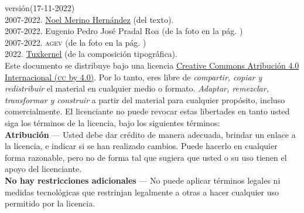 \documentclass[14pt,twoside,final]{extbook} %
\begin{document}
\setcounter{page}{1}
\parindent=5mm %
\parskip=0mm %
\newpage
\pagestyle{empty}
\newpage
\pagestyle{empty}
\vspace*{0pt}
\vfill
\begin{scriptsize}
\begin{flushleft}
\begin{minipage}{7.5cm}
\def\fileversion{1.016}
\def\filedate{(17-11-2022)}
versión\space\fileversion\space\filedate \\

\textcopyright{} 2007-2022. \href{noel_merino@yahoo.com.mx}{Noel Merino Hernández} (del texto). \\ \textcopyright{} 2007-2022. Eugenio Pedro José Pradal Roa (de la foto en la pág. \pageref{fig:jalacingo-photo}) \\ \textcopyright{} 2007-2022. \textsc{agev} (de la foto en la pág. \pageref{fig:progreso-industrial}) \\ \textcopyright{} 2022. \href{muxkernel@gmail.com}{Tuxkernel} (de la composición tipográfica). \\

\noindent Este documento se distribuye bajo una licencia \href{https://creativecommons.org/licenses/by/4.0/deed.es}{Creative Commons Atribución 4.0 Internacional (\textsc{cc} by 4.0)}. Por lo tanto, eres libre de \emph{compartir, copiar y redistribuir} el material en cualquier medio o formato. \emph{Adaptar, remezclar, transformar y construir} a partir del material para cualquier propósito, incluso comercialmente. El licenciante no puede revocar estas libertades en tanto usted siga los términos de la licencia, bajo los siguientes términos: \\

\noindent \textbf{Atribución} --- Usted debe dar crédito de manera adecuada, brindar un enlace a la licencia, e indicar si se han realizado cambios. Puede hacerlo en cualquier forma razonable, pero no de forma tal que sugiera que usted o su uso tienen el apoyo del licenciante. \\

\noindent \textbf{No hay restricciones adicionales} --- No puede aplicar términos legales ni medidas tecnológicas que restrinjan legalmente a otras a hacer cualquier uso permitido por la licencia. \\


\end{minipage}
\end{flushleft}
\end{scriptsize}
\end{document}
